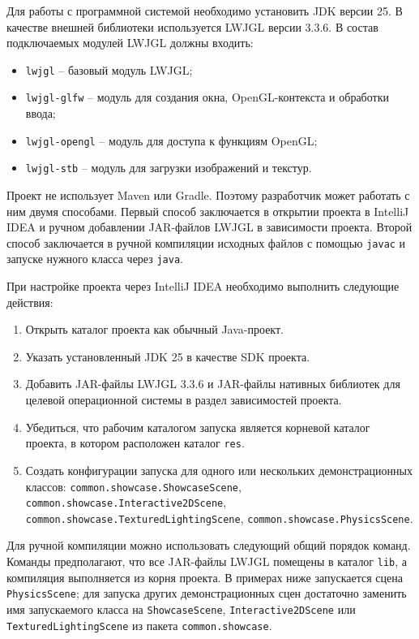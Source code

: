Для работы с программной системой необходимо установить JDK версии 25. В качестве внешней библиотеки используется LWJGL версии 3.3.6. В состав подключаемых модулей LWJGL должны входить:
\begin{itemize}
\item \texttt{lwjgl} -- базовый модуль LWJGL;
\item \texttt{lwjgl-glfw} -- модуль для создания окна, OpenGL-контекста и обработки ввода;
\item \texttt{lwjgl-opengl} -- модуль для доступа к функциям OpenGL;
\item \texttt{lwjgl-stb} -- модуль для загрузки изображений и текстур.
\end{itemize}

Проект не использует Maven или Gradle. Поэтому разработчик может работать с ним двумя способами. Первый способ заключается в открытии проекта в IntelliJ IDEA и ручном добавлении JAR-файлов LWJGL в зависимости проекта. Второй способ заключается в ручной компиляции исходных файлов с помощью \texttt{javac} и запуске нужного класса через \texttt{java}.

При настройке проекта через IntelliJ IDEA необходимо выполнить следующие действия:
\begin{enumerate}
\item Открыть каталог проекта как обычный Java-проект.
\item Указать установленный JDK 25 в качестве SDK проекта.
\item Добавить JAR-файлы LWJGL 3.3.6 и JAR-файлы нативных библиотек для целевой операционной системы в раздел зависимостей проекта.
\item Убедиться, что рабочим каталогом запуска является корневой каталог проекта, в котором расположен каталог \texttt{res}.
\item Создать конфигурации запуска для одного или нескольких демонстрационных классов: \texttt{common.showcase.ShowcaseScene}, \texttt{common.showcase.Interactive2DScene}, \texttt{common.showcase.TexturedLightingScene}, \texttt{common.showcase.PhysicsScene}.
\end{enumerate}

Для ручной компиляции можно использовать следующий общий порядок команд. Команды предполагают, что все JAR-файлы LWJGL помещены в каталог \texttt{lib}, а компиляция выполняется из корня проекта. В примерах ниже запускается сцена \texttt{PhysicsScene}; для запуска других демонстрационных сцен достаточно заменить имя запускаемого класса на \texttt{ShowcaseScene}, \texttt{Interactive2DScene} или \texttt{TexturedLightingScene} из пакета \texttt{common.showcase}.


